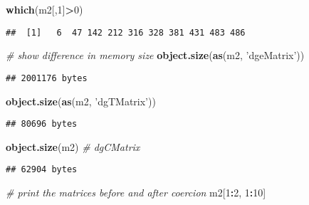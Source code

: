 \documentclass[]{article}
\newenvironment{Shaded}{\begin{snugshade}}{\end{snugshade}}
\newcommand{\CommentTok}[1]{\textcolor[rgb]{0.56,0.35,0.01}{\textit{#1}}}
\newcommand{\DecValTok}[1]{\textcolor[rgb]{0.00,0.00,0.81}{#1}}
\newcommand{\KeywordTok}[1]{\textcolor[rgb]{0.13,0.29,0.53}{\textbf{#1}}}
\newcommand{\NormalTok}[1]{#1}
\newcommand{\OperatorTok}[1]{\textcolor[rgb]{0.81,0.36,0.00}{\textbf{#1}}}
\newcommand{\StringTok}[1]{\textcolor[rgb]{0.31,0.60,0.02}{#1}}
\begin{document}
\begin{Shaded}
\begin{Highlighting}[]
\KeywordTok{which}\NormalTok{(m2[,}\DecValTok{1}\NormalTok{]}\OperatorTok{>}\DecValTok{0}\NormalTok{)}
\end{Highlighting}
\end{Shaded}

\begin{verbatim}
##  [1]   6  47 142 212 316 328 381 431 483 486
\end{verbatim}

\begin{Shaded}
\begin{Highlighting}[]
\CommentTok{# show difference in memory size}
\KeywordTok{object.size}\NormalTok{(}\KeywordTok{as}\NormalTok{(m2, }\StringTok{'dgeMatrix'}\NormalTok{))}
\end{Highlighting}
\end{Shaded}

\begin{verbatim}
## 2001176 bytes
\end{verbatim}

\begin{Shaded}
\begin{Highlighting}[]
\KeywordTok{object.size}\NormalTok{(}\KeywordTok{as}\NormalTok{(m2, }\StringTok{'dgTMatrix'}\NormalTok{))}
\end{Highlighting}
\end{Shaded}

\begin{verbatim}
## 80696 bytes
\end{verbatim}

\begin{Shaded}
\begin{Highlighting}[]
\KeywordTok{object.size}\NormalTok{(m2) }\CommentTok{# dgCMatrix}
\end{Highlighting}
\end{Shaded}

\begin{verbatim}
## 62904 bytes
\end{verbatim}

\begin{Shaded}
\begin{Highlighting}[]
\CommentTok{# print the matrices before and after coercion}
\NormalTok{m2[}\DecValTok{1}\OperatorTok{:}\DecValTok{2}\NormalTok{, }\DecValTok{1}\OperatorTok{:}\DecValTok{10}\NormalTok{] }
\end{Highlighting}
\end{Shaded}
\end{document}
